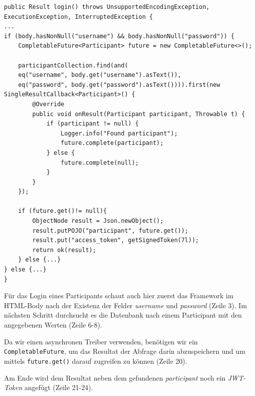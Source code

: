 \begin{lstlisting}[caption={Login}]
public Result login() throws UnsupportedEncodingException, ExecutionException, InterruptedException {
...
if (body.hasNonNull("username") && body.hasNonNull("password")) {
    CompletableFuture<Participant> future = new CompletableFuture<>();

    participantCollection.find(and(
    eq("username", body.get("username").asText()),
    eq("password", body.get("password").asText()))).first(new SingleResultCallback<Participant>() {
        @Override
        public void onResult(Participant participant, Throwable t) {
            if (participant != null) {
                Logger.info("Found participant");
                future.complete(participant);
            } else {
                future.complete(null);
            }
        }
    });

    if (future.get()!= null){
        ObjectNode result = Json.newObject();
        result.putPOJO("participant", future.get());
        result.put("access_token", getSignedToken(7l));
        return ok(result);
    } else {...}
} else {...}
}
\end{lstlisting}

Für das Login eines Participants schaut auch hier zuerst das Framework im HTML-Body nach der Existenz der Felder \textit{username} und \textit{password} (Zeile 3). Im nächsten Schritt durchsucht es die Datenbank nach einem Participant mit den angegebenen Werten (Zeile 6-8). 

Da wir einen asynchronen Treiber verwenden, benötigen wir ein \texttt{CompletableFuture}, um das Resultat der Abfrage darin abzuspeichern und um mittels \texttt{future.get()} darauf zugreifen zu können (Zeile 20).

Am Ende wird dem Resultat neben dem gefundenen \textit{participant} noch ein \textit{JWT-Token} angefügt (Zeile 21-24).

